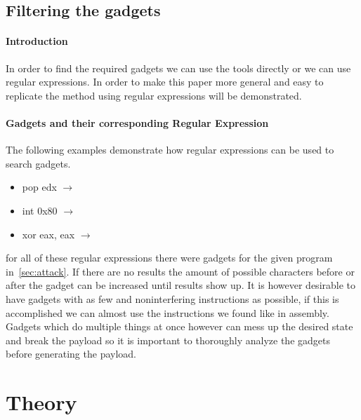 \documentclass[journal=tosc,submission, notanonymous]{iacrtrans}
\begin{document}
\subsection{Filtering the gadgets}
\label{subsec:filtering}
\paragraph{Introduction}
In order to find the required gadgets we can use the tools directly or we can use regular expressions. In order to make this paper more general and easy to replicate the method using regular expressions will be demonstrated.
\paragraph{Gadgets and their corresponding Regular Expression}
The following examples demonstrate how regular expressions can be used to search gadgets.
\begin{itemize}
\item pop edx  $\rightarrow$ 
\item int 0x80  $\rightarrow$  
\item xor eax, eax  $\rightarrow$  
\end{itemize}
for all of these regular expressions there were gadgets for the given program in~\cref{sec:attack}. If there are no results the amount of possible characters before or after the gadget can be increased until results show up. It is however desirable to have gadgets with as few and noninterfering instructions as possible, if this is accomplished we can almost use the instructions we found like in assembly. Gadgets which do multiple things at once however can mess up the desired state and break the payload so it is important to thoroughly analyze the gadgets before generating the payload.

\section{Theory}
\end{document}

